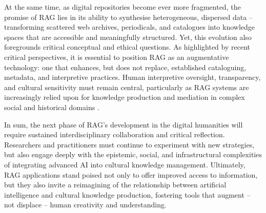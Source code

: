 \begin{spacing}{1.5}
At the same time, as digital repositories become ever more fragmented, the promise of RAG lies in its ability to synthesise heterogeneous, dispersed data -- transforming scattered web archives, periodicals, and catalogues into knowledge spaces that are accessible and meaningfully structured. Yet, this evolution also foregrounds critical conceptual and ethical questions. As highlighted by recent critical perspectives, it is essential to position RAG as an augmentative technology: one that enhances, but does not replace, established cataloguing, metadata, and interpretive practices. Human interpretive oversight, transparency, and cultural sensitivity must remain central, particularly as RAG systems are increasingly relied upon for knowledge production and mediation in complex social and historical domains \citep{di_marcantonio_intelligenza_2024}.

In sum, the next phase of RAG’s development in the digital humanities will require sustained interdisciplinary collaboration and critical reflection. Researchers and practitioners must continue to experiment with new strategies, but also engage deeply with the epistemic, social, and infrastructural complexities of integrating advanced AI into cultural knowledge management. Ultimately, RAG applications stand poised not only to offer improved access to information, but they also invite a reimagining of the relationship between artificial intelligence and cultural knowledge production, fostering tools that augment – not displace – human creativity and understanding.
\end{spacing}